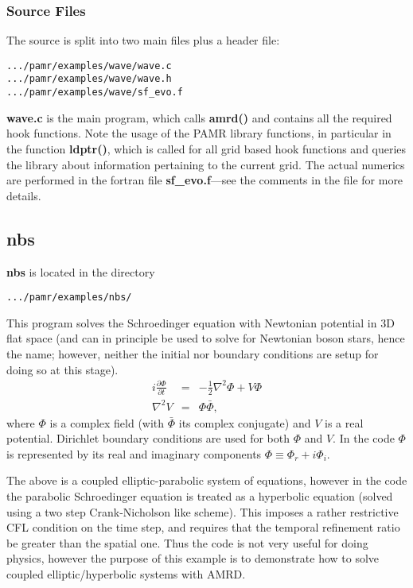 \documentclass[aps,amssymb,unsortedaddress,nofootinbib]{revtex4}
\begin{document}
\subsubsection{Source Files}\label{sec_wave_source}
The source is split into two main files plus a header file:
\begin{verbatim}
.../pamr/examples/wave/wave.c
.../pamr/examples/wave/wave.h
.../pamr/examples/wave/sf_evo.f
\end{verbatim}
{\bf wave.c} is the main program, which calls {\bf amrd()} and contains
all the required hook functions. Note the usage of the PAMR library
functions, in particular in the function {\bf ldptr()}, which is called
for all grid based hook functions and queries the library about information
pertaining to the current grid. The actual numerics are performed in the
fortran file {\bf sf\_evo.f}---see the comments in the file for more details.

\subsection{nbs}
{\bf nbs} is located in the directory
\begin{verbatim}
.../pamr/examples/nbs/
\end{verbatim}
This program solves the Schroedinger equation with Newtonian potential
in 3D flat space (and can in principle be used to solve for Newtonian boson
stars, hence the name; however, neither the initial nor boundary conditions
are setup for doing so at this stage). 
\begin{eqnarray}
i \frac{\partial \Phi}{\partial t} &=& -\frac{1}{2} \nabla^2 \Phi + V \Phi \\
\nabla^2 V &=& \Phi\bar{\Phi},
\end{eqnarray}
where $\Phi$ is a complex field (with $\bar{\Phi}$ its complex conjugate) and
$V$ is a real potential. Dirichlet boundary conditions are used for both
$\Phi$ and $V$. In the code $\Phi$ is represented by its real and imaginary
components $\Phi \equiv \Phi_r + i \Phi_i$.

The above is a coupled elliptic-parabolic system of equations, however in the
code the parabolic Schroedinger equation is treated as a hyperbolic equation
(solved using a two step Crank-Nicholson like scheme). This imposes a rather
restrictive CFL condition on the time step, and requires that the temporal refinement ratio be 
greater than the spatial one. Thus the code is not very useful for doing
physics, however the purpose of this example is to demonstrate how 
to solve coupled elliptic/hyperbolic systems with AMRD. 
\end{document}
